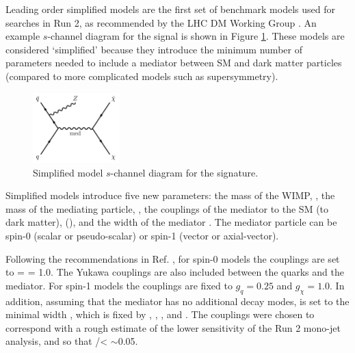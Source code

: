 Leading order simplified models are the first set of benchmark models used for \etmissX searches in Run 2, as recommended by the LHC DM Working Group \cite{Boveia:2016mrp}. An example $s$-channel diagram for the \Zetmiss signal is shown in Figure \ref{fig:simp}. These models are considered `simplified' because they introduce the minimum number of parameters needed to include a mediator between SM and dark matter particles (compared to more complicated models such as supersymmetry). 

\begin{figure}[htb]
\centering
\includegraphics[width=0.3\textwidth]{Figures/simp.png}
\caption{Simplified model $s$-channel diagram for the \monoZ signature. \cite{Aaboud:2017bja}}
\label{fig:simp}
\end{figure}

Simplified models introduce five new parameters: the mass of the WIMP, \mchi, the mass of the mediating particle, \mmed, the couplings of the mediator to the SM (to dark matter), \gq (\gchi), and the width of the mediator \Wmed. The mediator particle can be spin-0 (scalar or pseudo-scalar) or spin-1 (vector or axial-vector). 




Following the recommendations in Ref. \cite{Boveia:2016mrp}, for spin-0 models the couplings are set to \gq = \gchi = 1.0. The Yukawa couplings are also included between the quarks and the mediator. For spin-1 models the couplings are fixed to $g_q = 0.25$ and $g_\chi = 1.0$. In addition, assuming that the mediator has no additional decay modes, \Wmed is set to the minimal width \cite{Abercrombie:2015wmb}, which is fixed by \gq, \gchi, \mchi, and \mmed. The couplings were chosen to correspond with a rough estimate of the lower sensitivity of the Run 2 mono-jet analysis, and so that \Wmed/\mmed < $\sim$0.05.

